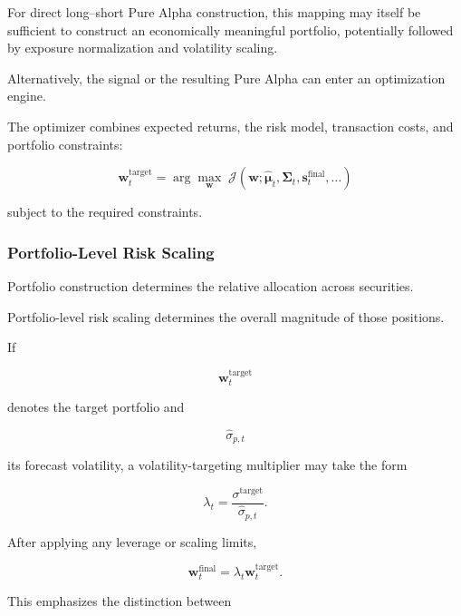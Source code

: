 \documentclass[11pt,a4paper]{article}
\begin{document}
For direct long--short Pure Alpha construction, this mapping may itself be
sufficient to construct an economically meaningful portfolio, potentially
followed by exposure normalization and volatility scaling.

Alternatively, the signal or the resulting Pure Alpha can enter an optimization
engine.

The optimizer combines expected returns, the risk model, transaction costs, and
portfolio constraints:

\begin{equation}
\boxed{
\mathbf{w}_t^{\mathrm{target}}
=
\arg\max_{\mathbf{w}}
\;
\mathcal{J}
\left(
\mathbf{w};
\widehat{\boldsymbol{\mu}}_t,
\widehat{\boldsymbol{\Sigma}}_t,
\mathbf{s}_t^{\mathrm{final}},
\ldots
\right)
}
\end{equation}

subject to the required constraints.


\subsubsection{Portfolio-Level Risk Scaling}

Portfolio construction determines the relative allocation across securities.

Portfolio-level risk scaling determines the overall magnitude of those
positions.

If

\begin{equation}
\mathbf{w}_t^{\mathrm{target}}
\end{equation}

denotes the target portfolio and

\begin{equation}
\widehat{\sigma}_{p,t}
\end{equation}

its forecast volatility, a volatility-targeting multiplier may take the form

\begin{equation}
\lambda_t
=
\frac{
\sigma^{\mathrm{target}}
}{
\widehat{\sigma}_{p,t}
}.
\end{equation}

After applying any leverage or scaling limits,

\begin{equation}
\boxed{
\mathbf{w}_t^{\mathrm{final}}
=
\lambda_t
\mathbf{w}_t^{\mathrm{target}}.
}
\end{equation}

This emphasizes the distinction between
\end{document}
